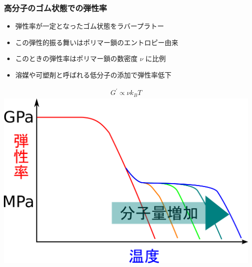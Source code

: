 \documentclass[12pt, dvipdfmx]{beamer}
\begin{document}
\begin{frame}
	\frametitle{高分子のゴム状態での弾性率}
				\begin{itemize}
					\item 弾性率が一定となったゴム状態をラバープラトー
					\item この弾性的振る舞いはポリマー鎖のエントロピー由来
					\item このときの弾性率はポリマー鎖の数密度 $\nu$ に比例
					\item 溶媒や可塑剤と呼ばれる低分子の添加で弾性率低下
				\end{itemize}
				\vspace{-1\baselineskip}
					\begin{align*}
						G^{\prime} \propto \nu k_B T
					\end{align*}
				\centering
						\includegraphics[width=.5\textwidth]{polymer_spectrum_2.png}
\end{frame}
\end{document}
